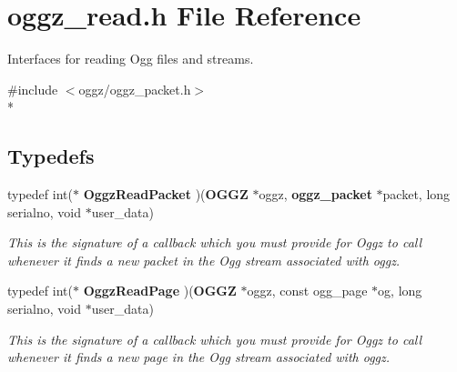 \section{oggz\-\_\-read.\-h File Reference}
\label{oggz__read_8h}


Interfaces for reading Ogg files and streams.  


{\ttfamily \#include $<$oggz/oggz\-\_\-packet.\-h$>$}\\*
\subsection*{Typedefs}
\begin{DoxyCompactItemize}
\item 
typedef int($\ast$ {\bf Oggz\-Read\-Packet} )({\bf O\-G\-G\-Z} $\ast$oggz, {\bf oggz\-\_\-packet} $\ast$packet, long serialno, void $\ast$user\-\_\-data)
\begin{DoxyCompactList}\small\item\em This is the signature of a callback which you must provide for Oggz to call whenever it finds a new packet in the Ogg stream associated with {\itshape oggz}. \end{DoxyCompactList}\item 
typedef int($\ast$ {\bf Oggz\-Read\-Page} )({\bf O\-G\-G\-Z} $\ast$oggz, const ogg\-\_\-page $\ast$og, long serialno, void $\ast$user\-\_\-data)
\begin{DoxyCompactList}\small\item\em This is the signature of a callback which you must provide for Oggz to call whenever it finds a new page in the Ogg stream associated with {\itshape oggz}. \end{DoxyCompactList}\end{DoxyCompactItemize}
